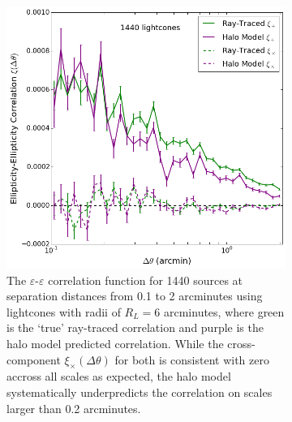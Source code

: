 \documentclass[%
 reprint,
 amsmath,amssymb,
 aps,nofootinbib
]{revtex4-1}
\begin{document}
\begin{figure}
    \centering
    \begin{subfigure}{0.475\textwidth}
        \includegraphics[width=\textwidth]{figs-swe/thesis/gg_corr.png}
        \captionsetup{justification=raggedright,singlelinecheck=false}
        \caption{The $\varepsilon$-$\varepsilon$ correlation function for 1440 sources at separation distances from 0.1 to 2 arcminutes using lightcones with radii of $R_L=6$ arcminutes, where green is the `true' ray-traced correlation and purple is the halo model predicted correlation. While the cross-component $\xi_\times(\Delta\theta)$ for both is consistent with zero accross all scales as expected, the halo model systematically underpredicts the correlation on scales larger than 0.2 arcminutes.}
        \label{fig:gg_corr}
    \end{subfigure}
    ~~
    \begin{subfigure}{0.475\textwidth}

\end{subfigure}
\end{figure}
\end{document}
